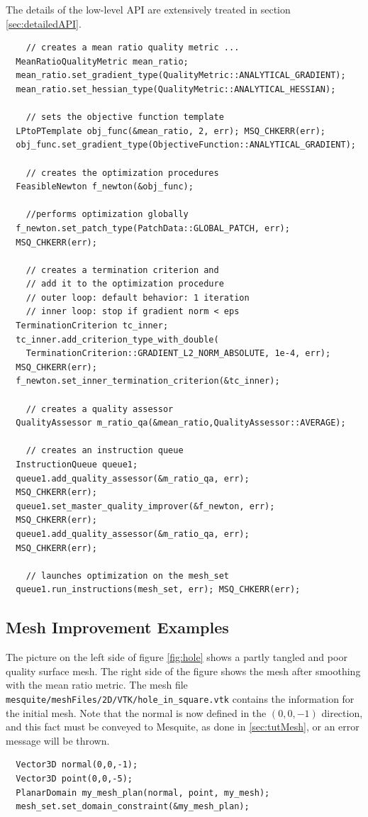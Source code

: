 \documentclass[letter]{report}
\begin{document}
The details of the low-level API are extensively treated in 
section \ref{sec:detailedAPI}.
\begin{verbatim}
    // creates a mean ratio quality metric ...
  MeanRatioQualityMetric mean_ratio;
  mean_ratio.set_gradient_type(QualityMetric::ANALYTICAL_GRADIENT);
  mean_ratio.set_hessian_type(QualityMetric::ANALYTICAL_HESSIAN);

    // sets the objective function template
  LPtoPTemplate obj_func(&mean_ratio, 2, err); MSQ_CHKERR(err);
  obj_func.set_gradient_type(ObjectiveFunction::ANALYTICAL_GRADIENT);
  
    // creates the optimization procedures
  FeasibleNewton f_newton(&obj_func);

    //performs optimization globally
  f_newton.set_patch_type(PatchData::GLOBAL_PATCH, err); 
  MSQ_CHKERR(err);

    // creates a termination criterion and 
    // add it to the optimization procedure
    // outer loop: default behavior: 1 iteration
    // inner loop: stop if gradient norm < eps
  TerminationCriterion tc_inner;
  tc_inner.add_criterion_type_with_double(
    TerminationCriterion::GRADIENT_L2_NORM_ABSOLUTE, 1e-4, err); 
  MSQ_CHKERR(err);
  f_newton.set_inner_termination_criterion(&tc_inner);

    // creates a quality assessor
  QualityAssessor m_ratio_qa(&mean_ratio,QualityAssessor::AVERAGE);

    // creates an instruction queue
  InstructionQueue queue1;
  queue1.add_quality_assessor(&m_ratio_qa, err); 
  MSQ_CHKERR(err);
  queue1.set_master_quality_improver(&f_newton, err); 
  MSQ_CHKERR(err);
  queue1.add_quality_assessor(&m_ratio_qa, err); 
  MSQ_CHKERR(err);

    // launches optimization on the mesh_set
  queue1.run_instructions(mesh_set, err); MSQ_CHKERR(err);
\end{verbatim} 

\subsection{Mesh Improvement Examples}

The picture on the left side of figure \ref{fig:hole} shows a partly tangled 
and poor quality surface mesh. The right side of the figure shows the mesh 
after 
smoothing with the mean ratio metric. 
The mesh file \texttt{mesquite/meshFiles/2D/VTK/hole\_in\_square.vtk} contains the information for
the initial mesh. Note that the normal is now defined in the $(0,0,-1)$ direction, and this fact must be conveyed 
to Mesquite, as done in \ref{sec:tutMesh}, or an error message will be thrown. 
\begin{verbatim}
  Vector3D normal(0,0,-1);
  Vector3D point(0,0,-5);
  PlanarDomain my_mesh_plan(normal, point, my_mesh);
  mesh_set.set_domain_constraint(&my_mesh_plan);
\end{verbatim}
\end{document}
